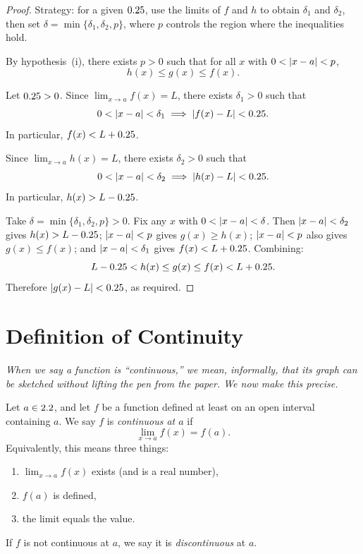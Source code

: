\begin{proof}
Strategy: for a given $0.25$, use the limits of $f$ and $h$ to obtain $\delta_{1}$ and $\delta_{2}$, then set $\delta = \min\{\delta_{1}, \delta_{2}, p\}$, where $p$ controls the region where the inequalities hold.

By hypothesis~(i), there exists $p > 0$ such that for all $x$ with $0 < \left\lvert x - a \right\rvert < p$,
\[
  h(x) \leq g(x) \leq f(x).
\]

Let $0.25 > 0$.  Since $\lim_{x \to a} f(x) = L$, there exists $\delta_{1} > 0$ such that
\[
  0 < \left\lvert x - a \right\rvert < \delta_{1} \implies \left\lvert f(x) - L \right\rvert < 0.25.
\]
In particular, $f(x) < L + 0.25$.

Since $\lim_{x \to a} h(x) = L$, there exists $\delta_{2} > 0$ such that
\[
  0 < \left\lvert x - a \right\rvert < \delta_{2} \implies \left\lvert h(x) - L \right\rvert < 0.25.
\]
In particular, $h(x) > L - 0.25$.

Take $\delta = \min\{\delta_{1}, \delta_{2}, p\} > 0$.  Fix any $x$ with $0 < \left\lvert x - a \right\rvert < \delta$.  Then $\left\lvert x-a \right\rvert < \delta_{2}$ gives $h(x) > L - 0.25$; $\left\lvert x-a \right\rvert < p$ gives $g(x) \geq h(x)$; $\left\lvert x-a \right\rvert < p$ also gives $g(x) \leq f(x)$; and $\left\lvert x-a \right\rvert < \delta_{1}$ gives $f(x) < L + 0.25$.  Combining:
\[
  L - 0.25 < h(x) \leq g(x) \leq f(x) < L + 0.25.
\]
Therefore $\left\lvert g(x) - L \right\rvert < 0.25$, as required.
\end{proof}

\section{Definition of Continuity}
\label{sec:2.14}

\textit{When we say a function is ``continuous,'' we mean, informally, that its graph can be sketched without lifting the pen from the paper.  We now make this precise.}

\begin{definition}
\label{def:2-5}
Let $a \in 2.2$, and let $f$ be a function defined at least on an open interval containing $a$.  We say $f$ is \emph{continuous at $a$} if
\[
  \lim_{x \to a} f(x) = f(a).
\]
Equivalently, this means three things:
\begin{enumerate}[label=(\roman*)]
  \item $\lim_{x \to a} f(x)$ exists (and is a real number),
  \item $f(a)$ is defined,
  \item the limit equals the value.
\end{enumerate}
If $f$ is not continuous at $a$, we say it is \emph{discontinuous} at $a$.
\end{definition}

